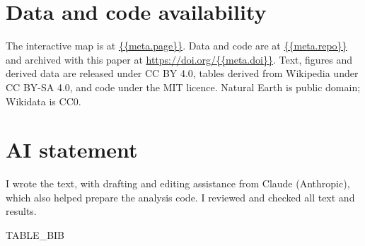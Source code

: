 \documentclass[11pt,a4paper]{article}
\begin{document}
\section*{Data and code availability}
The interactive map is at \url{{{meta.page}}}. Data and code are at \url{{{meta.repo}}} and archived with this paper at \url{https://doi.org/{{meta.doi}}}. Text, figures and derived data are released under CC BY 4.0, tables derived from Wikipedia under CC BY-SA 4.0, and code under the MIT licence. Natural Earth is public domain; Wikidata is CC0.

\section*{AI statement}
I wrote the text, with drafting and editing assistance from Claude (Anthropic), which also helped prepare the analysis code. I reviewed and checked all text and results.

{{TABLE_BIB}}
\end{document}
